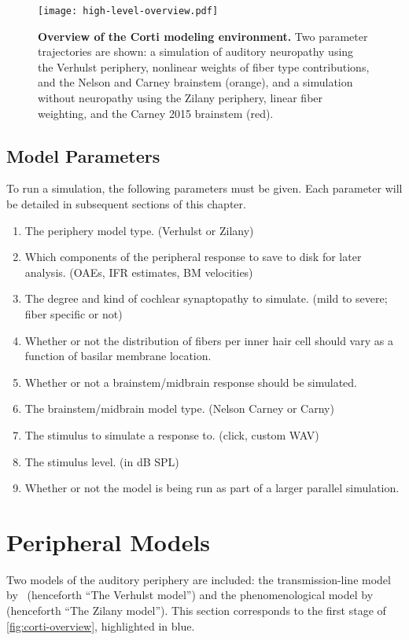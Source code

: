 \begin{figure}[htbp]
	\centering
	\texttt{[image: high-level-overview.pdf]}
	\caption[Overview of the Corti Modeling Environment.]{\textbf{Overview of the Corti modeling environment.} Two parameter trajectories are shown: a simulation of auditory neuropathy using the Verhulst periphery, nonlinear weights of fiber type contributions, and the Nelson and Carney brainstem (orange), and a simulation without neuropathy using the Zilany periphery, linear fiber weighting, and the Carney 2015 brainstem (red).}
	\label{fig:corti-overview}
	\end{figure}

\subsection{Model Parameters} %
\label{sub:model_parameters}
To run a simulation, the following parameters must be given.  Each parameter will be detailed in subsequent sections of this chapter. 

\begin{enumerate}
	\item The periphery model type. (Verhulst or Zilany)
	\item Which components of the peripheral response to save to disk for later analysis. (OAEs, IFR estimates, BM velocities)
	\item The degree and kind of cochlear synaptopathy to simulate. (mild to severe; fiber specific or not)
	\item Whether or not the distribution of fibers per inner hair cell should vary as a function of basilar membrane location.
	\item Whether or not a brainstem/midbrain response should be simulated.
	\item The brainstem/midbrain model type. (Nelson Carney or Carny)
	\item The stimulus to simulate a response to.  (click, custom WAV)
	\item The stimulus level. (in dB SPL)
	\item Whether or not the model is being run as part of a larger parallel simulation.
\end{enumerate}

\section{Peripheral Models} %
\label{sec:peripheral_models}
Two models of the auditory periphery are included: the transmission-line model by~\cite{Verhulst2015Functional} (henceforth ``The Verhulst model'') and the phenomenological model by~\cite{Zilany2014Updated} (henceforth ``The Zilany model'').  This section corresponds to the first stage of \autoref{fig:corti-overview}, highlighted in blue.

